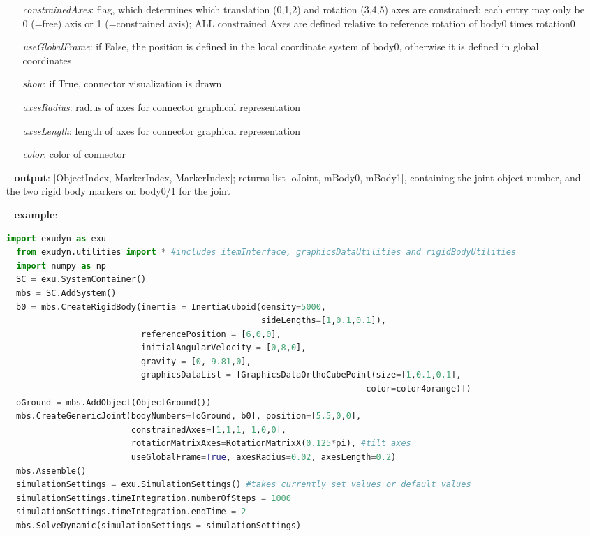 \begin{itemize}[leftmargin=0.7cm]
\begin{itemize}[leftmargin=1.2cm]
\item[]{\it constrainedAxes}: flag, which determines which translation (0,1,2) and rotation (3,4,5) axes are constrained; each entry may only be 0 (=free) axis or 1 (=constrained axis); ALL constrained Axes are defined relative to reference rotation of body0 times rotation0
\item[]{\it useGlobalFrame}: if False, the position is defined in the local coordinate system of body0, otherwise it is defined in global coordinates
\item[]{\it show}: if True, connector visualization is drawn
\item[]{\it axesRadius}: radius of axes for connector graphical representation
\item[]{\it axesLength}: length of axes for connector graphical representation
\item[]{\it color}: color of connector
\end{itemize}
\item[--]
{\bf output}: [ObjectIndex, MarkerIndex, MarkerIndex]; returns list [oJoint, mBody0, mBody1], containing the joint object number, and the two rigid body markers on body0/1 for the joint
\item[--]
{\bf example}: \vspace{-12pt}\ei\begin{lstlisting}[language=Python, xleftmargin=36pt]
  import exudyn as exu
  from exudyn.utilities import * #includes itemInterface, graphicsDataUtilities and rigidBodyUtilities
  import numpy as np
  SC = exu.SystemContainer()
  mbs = SC.AddSystem()
  b0 = mbs.CreateRigidBody(inertia = InertiaCuboid(density=5000,
                                                   sideLengths=[1,0.1,0.1]),
                           referencePosition = [6,0,0],
                           initialAngularVelocity = [0,8,0],
                           gravity = [0,-9.81,0],
                           graphicsDataList = [GraphicsDataOrthoCubePoint(size=[1,0.1,0.1],
                                                                        color=color4orange)])
  oGround = mbs.AddObject(ObjectGround())
  mbs.CreateGenericJoint(bodyNumbers=[oGround, b0], position=[5.5,0,0],
                         constrainedAxes=[1,1,1, 1,0,0],
                         rotationMatrixAxes=RotationMatrixX(0.125*pi), #tilt axes
                         useGlobalFrame=True, axesRadius=0.02, axesLength=0.2)
  mbs.Assemble()
  simulationSettings = exu.SimulationSettings() #takes currently set values or default values
  simulationSettings.timeIntegration.numberOfSteps = 1000
  simulationSettings.timeIntegration.endTime = 2
  mbs.SolveDynamic(simulationSettings = simulationSettings)
\end{lstlisting}\vspace{-24pt}\bi\item[]\vspace{-24pt}\vspace{12pt}\end{itemize}
%

